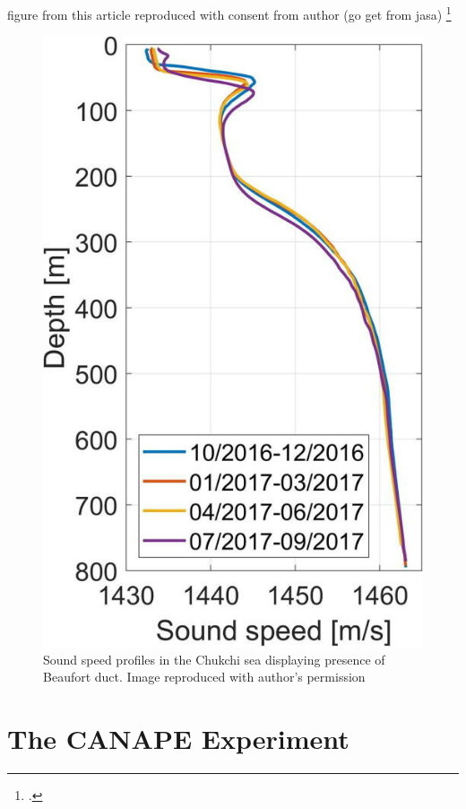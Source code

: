 figure from this article reproduced with consent from author (go get from jasa) \footcite[]{Bonnel2021}
\begin{figure}[ht]
\centering
\includegraphics[scale=0.5]{Figures/ssp.jpeg}
\caption{Sound speed profiles in the Chukchi sea displaying presence of Beaufort duct. Image reproduced with author's permission}
\label{fig_ssp}
\end{figure}
\section{The CANAPE Experiment} \label{intro_canape}

